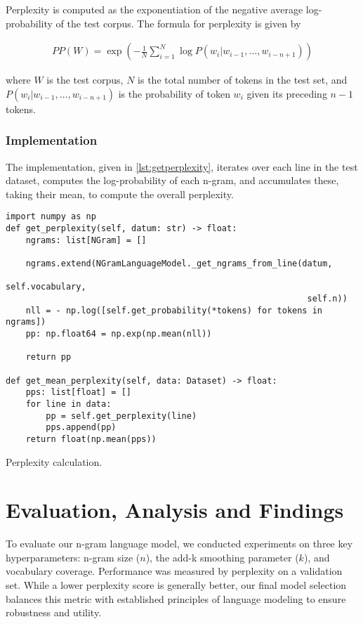 \documentclass[a4paper]{article}
\begin{document}
Perplexity is computed as the exponentiation of the negative average log-probability of the test corpus. The formula for perplexity is given by

\begin{align*}
  PP(W)= \exp\left(-\frac{1}{N} \sum_{i=1}^{N} \log P(w_i | w_{i-1}, \ldots, w_{i-n+1})\right)
\end{align*}

where \(W\) is the test corpus, \(N\) is the total number of tokens in the test set, and \(P(w_i | w_{i-1}, \ldots, w_{i-n+1})\) is the probability of token \(w_i\) given its preceding \(n-1\) tokens.

\subsubsection{Implementation}
The implementation, given in \ref{lst:getperplexity}, iterates over each line in the test dataset, computes the log-probability of each n-gram, and accumulates these, taking their mean, to compute the overall perplexity.

\begin{listing}[H]
  \begin{verbatim}
import numpy as np
def get_perplexity(self, datum: str) -> float:
    ngrams: list[NGram] = []

    ngrams.extend(NGramLanguageModel._get_ngrams_from_line(datum, 
                                                            self.vocabulary, 
                                                            self.n))
    nll = - np.log([self.get_probability(*tokens) for tokens in ngrams])
    pp: np.float64 = np.exp(np.mean(nll))

    return pp

def get_mean_perplexity(self, data: Dataset) -> float:
    pps: list[float] = []
    for line in data:
        pp = self.get_perplexity(line)
        pps.append(pp)
    return float(np.mean(pps))
\end{verbatim}
  \caption{Perplexity calculation.}
  \label{lst:getperplexity}
\end{listing}

\section{Evaluation, Analysis and Findings}

To evaluate our n-gram language model, we conducted experiments on three key hyperparameters: n-gram size ($n$), the add-k smoothing parameter ($k$), and vocabulary coverage. Performance was measured by perplexity on a validation set. While a lower perplexity score is generally better, our final model selection balances this metric with established principles of language modeling to ensure robustness and utility.
\end{document}

